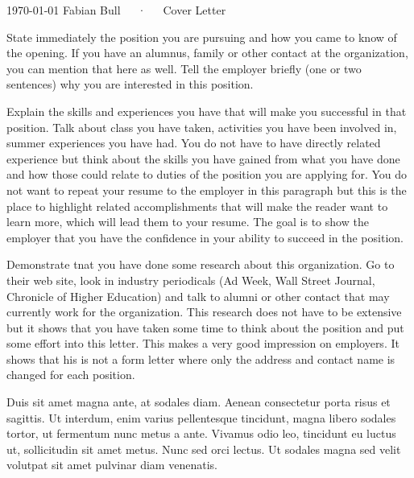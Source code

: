 \documentclass[11pt, a4paper]{awesome-cv}
\begin{document}
\makecvheader[R]

\makecvfooter
  {\today}
  {Fabian Bull~~~·~~~Cover Letter}
  {}

\makelettertitle

\begin{cvletter}

State immediately the position you are pursuing and how you came to know of the opening.
If you have an alumnus, family or other contact at the organization, you can mention that here as well.
Tell the employer briefly (one or two sentences) why you are interested in this position.

Explain the skills and experiences you have that will make you successful in that position.
Talk about class you have taken, activities you have been involved in, summer experiences you have had.
You do not have to have directly related experience but think about the skills you have gained from what
  you have done and how those could relate to duties of the position you are applying for.
You do not want to repeat your resume to the employer in this paragraph but this is the place to highlight
  related accomplishments that will make the reader want to learn more, which will lead them to your resume.
The goal is to show the employer that you have the confidence in your ability to succeed in the position.

Demonstrate tnat you have done some research about this organization.
Go to their web site, look in industry periodicals (Ad Week, Wall Street Journal, Chronicle of Higher Education)
  and talk to alumni or other contact that may currently work for the organization.
This research does not have to be extensive but it shows that you have taken some time to think about the position
  and put some effort into this letter.
This makes a very good impression on employers.
It shows that his is not a form letter where only the address and contact name is changed for each position.

Duis sit amet magna ante, at sodales diam. Aenean consectetur porta risus et sagittis. Ut interdum, enim varius pellentesque tincidunt, magna libero sodales tortor, ut fermentum nunc metus a ante. Vivamus odio leo, tincidunt eu luctus ut, sollicitudin sit amet metus. Nunc sed orci lectus. Ut sodales magna sed velit volutpat sit amet pulvinar diam venenatis.


\end{cvletter}
\end{document}
